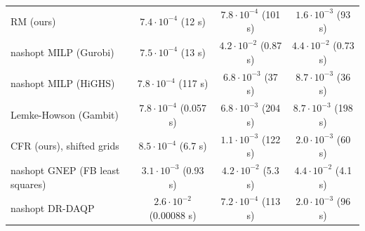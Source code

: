 \begin{tabular}{lccc}
RM (ours) & $7.4\cdot10^{-4}$ (12 s) & $7.8\cdot10^{-4}$ (101 s) & $1.6\cdot10^{-3}$ (93 s) \\
nashopt MILP (Gurobi) & $7.5\cdot10^{-4}$ (13 s) & $4.2\cdot10^{-2}$ (0.87 s) & $4.4\cdot10^{-2}$ (0.73 s) \\
nashopt MILP (HiGHS) & $7.8\cdot10^{-4}$ (117 s) & $6.8\cdot10^{-3}$ (37 s) & $8.7\cdot10^{-3}$ (36 s) \\
Lemke-Howson (Gambit) & $7.8\cdot10^{-4}$ (0.057 s) & $6.8\cdot10^{-3}$ (204 s) & $8.7\cdot10^{-3}$ (198 s) \\
CFR (ours), shifted grids & $8.5\cdot10^{-4}$ (6.7 s) & $1.1\cdot10^{-3}$ (122 s) & $2.0\cdot10^{-3}$ (60 s) \\
nashopt GNEP (FB least squares) & $3.1\cdot10^{-3}$ (0.93 s) & $4.2\cdot10^{-2}$ (5.3 s) & $4.4\cdot10^{-2}$ (4.1 s) \\
nashopt DR-DAQP & $2.6\cdot10^{-2}$ (0.00088 s) & $7.2\cdot10^{-4}$ (113 s) & $2.0\cdot10^{-3}$ (96 s) \\
\bottomrule
\end{tabular}
